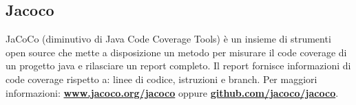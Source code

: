 \subsection{Jacoco}
JaCoCo (diminutivo di Java Code Coverage Tools) è un insieme di strumenti open source che mette a disposizione un metodo per misurare il code coverage di un progetto java e rilasciare un report completo. Il report fornisce informazioni di code coverage rispetto a: linee di codice, istruzioni e branch. Per maggiori informazioni: \textbf{\href{http://www.jacoco.org/jacoco/}{www.jacoco.org/jacoco}} oppure \textbf{\href{https://github.com/jacoco/jacoco}{github.com/jacoco/jacoco}}.